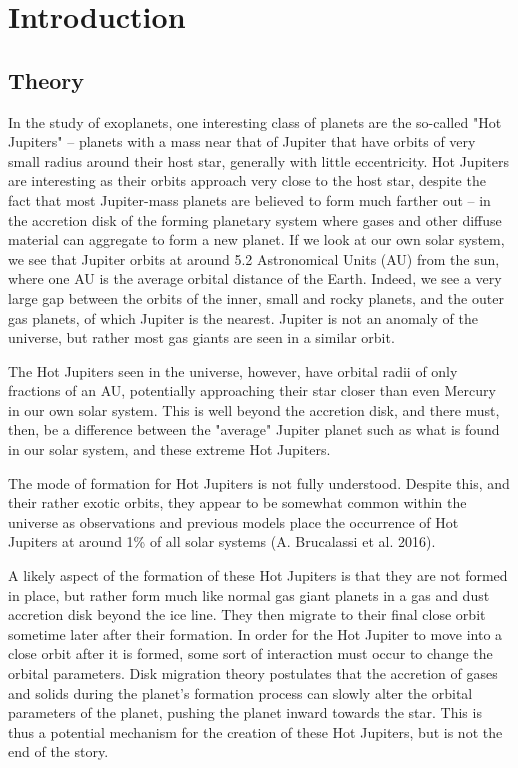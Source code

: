\documentclass[12pt]{article}
\begin{document}
\clearpage

\section{Introduction}

\subsection{Theory}

In the study of exoplanets, one interesting class of planets are the so-called "Hot Jupiters" -- planets with a mass near that of Jupiter 
that have orbits of very small radius around their host star, generally with little eccentricity.
Hot Jupiters are interesting as their orbits approach very close to the host star,
despite the fact that most Jupiter-mass planets are believed to form much farther
out -- in the accretion disk of the forming planetary system where gases 
and other diffuse material can aggregate to form a new planet. If we look at our own
solar system, we see that Jupiter orbits at around 5.2 Astronomical Units (AU) from the
sun, where one AU is the average orbital distance of the Earth. Indeed,
we see a very large gap between the orbits of the inner, small and rocky planets, and
the outer gas planets, of which Jupiter is the nearest. Jupiter is not an anomaly of
the universe, but rather most gas giants are seen in a similar orbit. %

The Hot Jupiters seen in the universe, however, have orbital 
radii of only fractions of an AU, potentially 
approaching their star closer than even Mercury in our own solar system. %
This is well beyond the accretion disk, and there must, then, be a difference between
the "average" Jupiter planet such as what is found in our solar system, and these
extreme Hot Jupiters.

The mode of formation for Hot Jupiters is not fully understood.
Despite this, and their rather exotic orbits, 
they appear to be somewhat common within the universe as observations and previous models place the occurrence of Hot Jupiters at around 1\% of all solar systems (A. Brucalassi et al. 2016).  

A likely aspect of the formation of these Hot Jupiters is that they are not formed in place, but rather form much like normal gas giant planets 
in a gas and dust accretion disk beyond the ice line. They then migrate to their final close orbit sometime later after their formation. 
In order for the Hot Jupiter to move into a close orbit after it is formed, some sort of interaction must occur to change the orbital parameters. 
Disk migration theory postulates that the accretion of gases and 
solids during the planet's formation process can slowly alter the orbital 
parameters of the planet,
pushing the planet inward towards the star.
This is thus a potential mechanism for the creation of these Hot Jupiters, but is not the end of the story.
\end{document}
